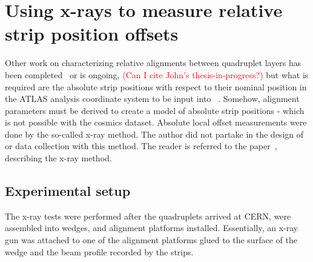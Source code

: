 
\chapter{Using x-rays to measure relative strip position offsets}
\label{chap:xray}


Other work on characterizing relative alignments between quadruplet layers has been completed~\cite{zhao_cosmic_2019} or is ongoing, \textcolor{red}{(Can I cite John's thesis-in-progress?)} but what is required are the absolute strip positions with respect to their nominal position in the ATLAS analysis coordinate system to be input into ~\cite{the_atlas_collaboration_athena}. Somehow, alignment parameters must be derived to create a model of absolute strip positions - which is not possible with the cosmics dataset. Absolute local offset measurements were done by the so-called x-ray method. The author did not partake in the design of or data collection with this method. The reader is referred to the paper~\cite{lefebvre_precision_2020}, describing the x-ray method.

\section{Experimental setup}

The x-ray tests were performed after the quadruplets arrived at CERN, were assembled into wedges, and alignment platforms installed. Essentially, an x-ray gun was attached to one of the alignment platforms glued to the surface of the wedge and the beam profile recorded by the strips.

